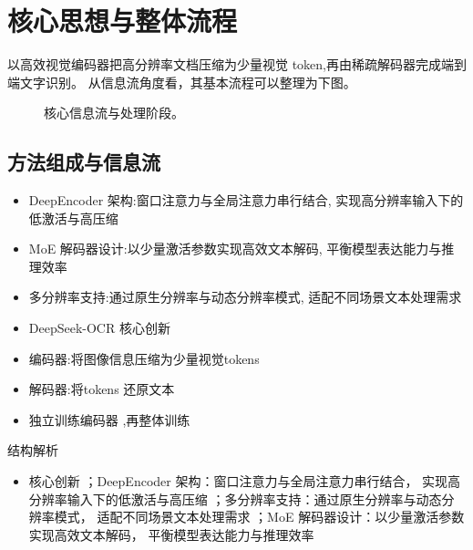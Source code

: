 \documentclass[UTF8,11pt,a4paper]{ctexart}
\begin{document}
\section{核心思想与整体流程}
以高效视觉编码器把高分辨率文档压缩为少量视觉 token,再由稀疏解码器完成端到端文字识别。 从信息流角度看，其基本流程可以整理为下图。

\begin{figure}[H]
\centering
{}
\caption{核心信息流与处理阶段。}
\end{figure}

\subsection{方法组成与信息流}
\begin{itemize}
\item DeepEncoder 架构:窗口注意力与全局注意力串行结合, 实现高分辨率输入下的低激活与高压缩
\item MoE 解码器设计:以少量激活参数实现高效文本解码, 平衡模型表达能力与推理效率
\item 多分辨率支持:通过原生分辨率与动态分辨率模式, 适配不同场景文本处理需求
\item DeepSeek-OCR 核心创新
\item 编码器:将图像信息压缩为少量视觉tokens
\item 解码器:将tokens 还原文本
\item 独立训练编码器 ,再整体训练
\end{itemize}

\begin{keybox}{结构解析}
\begin{itemize}
\item 核心创新 ；DeepEncoder 架构：窗口注意力与全局注意力串行结合， 实现高分辨率输入下的低激活与高压缩 ；多分辨率支持：通过原生分辨率与动态分辨率模式， 适配不同场景文本处理需求 ；MoE 解码器设计：以少量激活参数实现高效文本解码， 平衡模型表达能力与推理效率
\end{itemize}
\end{keybox}
\end{document}
